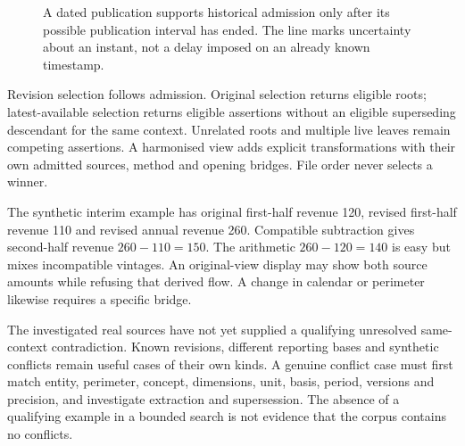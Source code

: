 \begin{figure}[htbp]
\centering
{}
\caption{A dated publication supports historical admission only after its
possible publication interval has ended. The line marks uncertainty about an
instant, not a delay imposed on an already known timestamp.}
\end{figure}

Revision selection follows admission. Original selection returns eligible
roots; latest-available selection returns eligible assertions without an
eligible superseding descendant for the same context. Unrelated roots and
multiple live leaves remain competing assertions. A harmonised view adds
explicit transformations with their own admitted sources, method and opening
bridges. File order never selects a winner.

The synthetic interim example has original first-half revenue 120, revised
first-half revenue 110 and revised annual revenue 260. Compatible subtraction
gives second-half revenue $260-110=150$. The arithmetic $260-120=140$ is easy
but mixes incompatible vintages. An original-view display may show both source
amounts while refusing that derived flow. A change in calendar or perimeter
likewise requires a specific bridge.

The investigated real sources have not yet supplied a qualifying unresolved
same-context contradiction. Known revisions, different reporting bases and
synthetic conflicts remain useful cases of their own kinds. A genuine conflict
case must first match entity, perimeter, concept, dimensions, unit, basis,
period, versions and precision, and investigate extraction and supersession.
The absence of a qualifying example in a bounded search is not evidence that
the corpus contains no conflicts.
